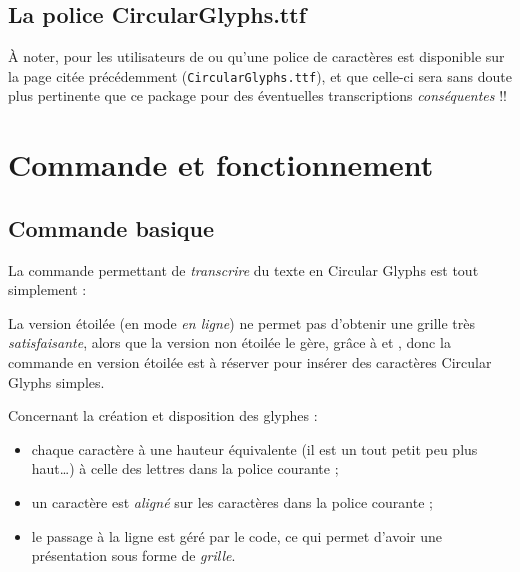 \documentclass[french,11pt,a4paper]{article}
\begin{document}
\subsection{La police CircularGlyphs.ttf}

À noter, pour les utilisateurs de  ou  qu'une police de caractères est disponible sur la page citée précédemment (\texttt{CircularGlyphs.ttf}), et que celle-ci sera sans doute plus pertinente que ce package pour des éventuelles transcriptions \textit{conséquentes} !!

\pagebreak

\section{Commande et fonctionnement}

\subsection{Commande basique}

La commande permettant de \textit{transcrire} du texte en \textsf{Circular Glyphs} est tout simplement :

\begin{demohigh}[language=latex/latex3,style/main=teal!15,style/code=teal!15]
\end{demohigh}

\begin{demohigh}[language=latex/latex3,style/main=teal!15,style/code=teal!15]
\end{demohigh}

La version étoilée (en mode \textit{en ligne}) ne permet pas d'obtenir une grille très \textit{satisfaisante}, alors que la version non étoilée le gère, grâce à  et , donc la commande en version étoilée est à réserver pour insérer des caractères \textsf{Circular Glyphs} simples.

\medskip

Concernant la création et disposition des glyphes :

\begin{itemize}
	\item chaque caractère à une hauteur équivalente (il est un tout petit peu plus haut\ldots) à celle des lettres  dans la police courante ;
	\item un caractère est \textit{aligné} sur les caractères  dans la police courante ;
	\item le passage à la ligne est géré par le code, ce qui permet d'avoir une présentation sous forme de \textit{grille}.
\end{itemize}
\end{document}
